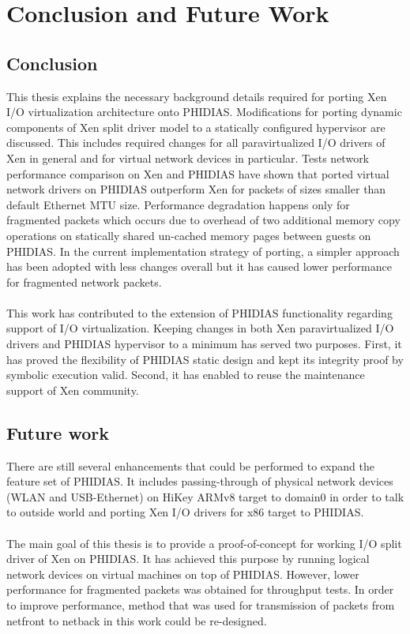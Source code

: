 \chapter{Conclusion and Future Work\label{cha:chapter8}}

\section{Conclusion \label{sec:Conclusion}}
This thesis explains the necessary background details required for porting Xen I/O virtualization architecture onto PHIDIAS. Modifications for porting dynamic components of Xen split driver model to a statically configured hypervisor are discussed. This includes required changes for all paravirtualized I/O drivers of Xen in general and for virtual network devices in particular. Tests network performance comparison on Xen and PHIDIAS have shown that ported virtual network drivers on PHIDIAS outperform Xen for packets of sizes smaller than default Ethernet MTU size. Performance degradation happens only for fragmented packets which occurs due to overhead of two additional memory copy operations on statically shared un-cached memory pages between guests on PHIDIAS. In the current implementation strategy of porting, a simpler approach has been adopted with less changes overall but it has caused lower performance for fragmented network packets.
\\
\\
This work has contributed to the extension of PHIDIAS functionality regarding support of I/O virtualization. 
Keeping changes in both Xen paravirtualized I/O drivers and PHIDIAS hypervisor to a minimum has served two purposes. First, it has proved the flexibility of PHIDIAS static design and kept its integrity proof by symbolic execution valid. Second, it has enabled to reuse the maintenance support of Xen community.

\section{Future work \label{sec:Futurework}}
There are still several enhancements that could be performed to expand the feature set of PHIDIAS. It includes passing-through of physical network devices (WLAN and USB-Ethernet) on HiKey ARMv8 target to domain0 in order to talk to outside world and porting Xen I/O drivers for x86 target to PHIDIAS.
\\
\\
The main goal of this thesis is to provide a proof-of-concept for working I/O split driver of Xen on PHIDIAS. It has achieved this purpose by running logical network devices on virtual machines on top of PHIDIAS. However, lower performance for fragmented packets was obtained for throughput tests. In order to improve performance, method that was used for transmission of packets from netfront to netback in this work could be re-designed. 


